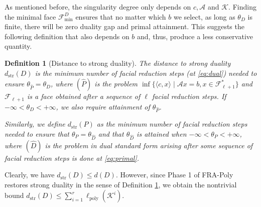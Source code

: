 \documentclass{article}
\newcommand{\inProd}[2]{\langle #1 , #2 \rangle }
\newcommand{\minFaceD}{ {\mathcal{F}_{\min}^D}}
\newcommand{\stdMap}{ {\mathcal{A}}}
\newcommand{\stdCone}{ {\mathcal{K}}}
\newcommand{\stdFace}{ \mathcal{F}}
\newcommand{\pOpt}{ {\theta _P}}
\newcommand{\dOpt}{ {\theta _D}}
\newcommand{\opt}[1]{ {\theta _{#1}}}
\newcommand{\distP}{\ell _{\text{poly}}}
\newcommand{\distS}{d _{\text{str}}}
\newtheorem{definition}{Definition}
\begin{document}
As mentioned before, the singularity degree only depends on $c,\stdMap$ and $\stdCone$. 
Finding the minimal face $\minFaceD$ ensures that no matter which $b$ we select, as long as 
$\dOpt$ is finite, there will be zero duality gap and primal attainment. This suggests 
the following definition that also depends on $b$ and, thus, produce a less conservative 
quantity. 

\begin{definition}[Distance to strong duality]\label{def:dist_str}
The distance to strong duality $\distS(D)$ is the minimum number of facial reduction 
steps (at \eqref{eq:dual}) needed to ensure $\opt{\hat P} = \dOpt$, where $(\hat P)$ is the problem 
$\inf \{\inProd{c}{x} \mid \stdMap x = b, x \in \stdFace _{\ell+1} ^* \}$ and 
$\stdFace _{\ell+1}$ is a face obtained after a sequence of $\ell$ facial reduction steps.
If  $-\infty < \dOpt < +\infty$, we also require attainment of $\opt{\hat P}$.

Similarly, we define $\distS(P)$ as the minimum number of facial reduction steps needed 
to ensure that  $\pOpt = \opt{\hat D}$ and that $\opt{\hat D}$ is attained when $-\infty < \pOpt < +\infty$, where $(\hat D)$ is the  problem in dual standard form arising after some sequence of facial reduction 
steps is done at \eqref{eq:primal}.
\end{definition}

Clearly, we have $\distS(D) \leq d(D)$. However, since Phase 1 of FRA-Poly restores 
strong duality in the sense of Definition \ref{def:dist_str}, we obtain the 
nontrivial bound $\distS(D) \leq \sum_{i=1}^r \distP(\stdCone^i)$.
\end{document}
